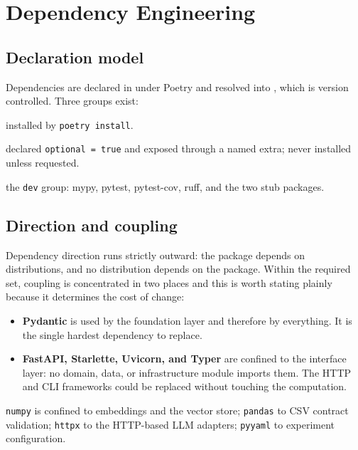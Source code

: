 
\chapter{Dependency Engineering}
\label{ch:dependency-engineering}

\section{Declaration model}

Dependencies are declared in  under Poetry and resolved
into , which is version controlled. Three groups exist:

\begin{description}[nosep]
  \item[Required runtime] installed by \texttt{poetry install}.
  \item[Optional runtime] declared \texttt{optional = true} and exposed through
    a named extra; never installed unless requested.
  \item[Development] the \texttt{dev} group: mypy, pytest, pytest-cov, ruff,
    and the two stub packages.
\end{description}

\section{Direction and coupling}

Dependency direction runs strictly outward: the package depends on
distributions, and no distribution depends on the package. Within the required
set, coupling is concentrated in two places and this is worth stating plainly
because it determines the cost of change:

\begin{itemize}
  \item \textbf{Pydantic} is used by the foundation layer and therefore by
    everything. It is the single hardest dependency to replace.
  \item \textbf{FastAPI, Starlette, Uvicorn, and Typer} are confined to the
    interface layer: no domain, data, or infrastructure module imports them.
    The HTTP and CLI frameworks could be replaced without touching the
    computation.
\end{itemize}

\texttt{numpy} is confined to embeddings and the vector store; \texttt{pandas}
to CSV contract validation; \texttt{httpx} to the HTTP-based LLM adapters;
\texttt{pyyaml} to experiment configuration.

